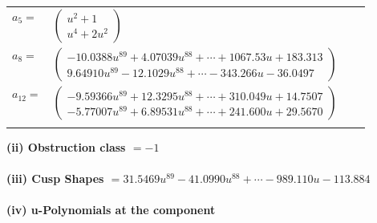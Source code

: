 \documentclass[1p]{elsarticle_modified}
\theoremstyle{definition}
\begin{document}
\begin{tabular}{m{7pt} m{180pt} m{7pt} m{180pt} }
\flushright $a_{5}=$&$\begin{pmatrix}u^2+1\\u^4+2 u^2\end{pmatrix}$ \\
\flushright $a_{8}=$&$\begin{pmatrix}-10.0388 u^{89}+4.07039 u^{88}+\cdots+1067.53 u+183.313\\9.64910 u^{89}-12.1029 u^{88}+\cdots-343.266 u-36.0497\end{pmatrix}$ \\
\flushright $a_{12}=$&$\begin{pmatrix}-9.59366 u^{89}+12.3295 u^{88}+\cdots+310.049 u+14.7507\\-5.77007 u^{89}+6.89531 u^{88}+\cdots+241.600 u+29.5670\end{pmatrix}$\\&\end{tabular}
\flushleft \textbf{(ii) Obstruction class $= -1$}\\~\\
\flushleft \textbf{(iii) Cusp Shapes $= 31.5469 u^{89}-41.0990 u^{88}+\cdots-989.110 u-113.884$}\\~\\
\newpage\renewcommand{\arraystretch}{1}
\flushleft \textbf{(iv) u-Polynomials at the component}\newline \\
\end{document}
